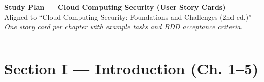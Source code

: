 \documentclass[11pt,letterpaper]{article}
\begin{document}
\begin{center}
{\LARGE \textbf{Study Plan --- Cloud Computing Security (User Story Cards)}}\\[4pt]
{\large Aligned to ``Cloud Computing Security: Foundations and Challenges (2nd ed.)''}\\[2pt]
\textit{One story card per chapter with example tasks and BDD acceptance criteria.}
\end{center}

\vspace{0.5em}
\hrule
\vspace{0.75em}

\tableofcontents
\newpage

\section{Section I — Introduction (Ch. 1--5)}
\end{document}
